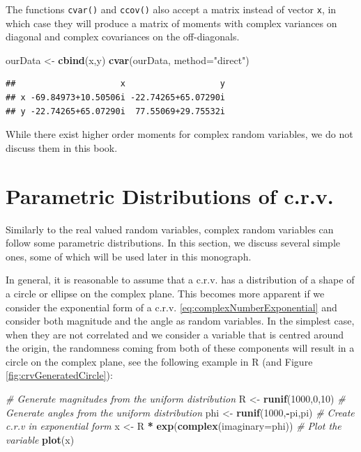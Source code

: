 \documentclass[
]{book}
\newenvironment{Shaded}{\begin{snugshade}}{\end{snugshade}}
\newcommand{\CommentTok}[1]{\textcolor[rgb]{0.56,0.35,0.01}{\textit{#1}}}
\newcommand{\DataTypeTok}[1]{\textcolor[rgb]{0.13,0.29,0.53}{#1}}
\newcommand{\DecValTok}[1]{\textcolor[rgb]{0.00,0.00,0.81}{#1}}
\newcommand{\KeywordTok}[1]{\textcolor[rgb]{0.13,0.29,0.53}{\textbf{#1}}}
\newcommand{\NormalTok}[1]{#1}
\newcommand{\OperatorTok}[1]{\textcolor[rgb]{0.81,0.36,0.00}{\textbf{#1}}}
\newcommand{\StringTok}[1]{\textcolor[rgb]{0.31,0.60,0.02}{#1}}
\begin{document}
The functions \texttt{cvar()} and \texttt{ccov()} also accept a matrix instead of vector \texttt{x}, in which case they will produce a matrix of moments with complex variances on diagonal and complex covariances on the off-diagonals.

\begin{Shaded}
\begin{Highlighting}[]
\NormalTok{ourData \textless{}{-}}\StringTok{ }\KeywordTok{cbind}\NormalTok{(x,y)}
\KeywordTok{cvar}\NormalTok{(ourData, }\DataTypeTok{method=}\StringTok{"direct"}\NormalTok{)}
\end{Highlighting}
\end{Shaded}

\begin{verbatim}
##                     x                   y
## x -69.84973+10.50506i -22.74265+65.07290i
## y -22.74265+65.07290i  77.55069+29.75532i
\end{verbatim}

While there exist higher order moments for complex random variables, we do not discuss them in this book.

\hypertarget{parametric-distributions-of-c.r.v.}{%
\section{Parametric Distributions of c.r.v.}\label{parametric-distributions-of-c.r.v.}}

Similarly to the real valued random variables, complex random variables can follow some parametric distributions. In this section, we discuss several simple ones, some of which will be used later in this monograph.

In general, it is reasonable to assume that a c.r.v. has a distribution of a shape of a circle or ellipse on the complex plane. This becomes more apparent if we consider the exponential form of a c.r.v. \eqref{eq:complexNumberExponential} and consider both magnitude and the angle as random variables. In the simplest case, when they are not correlated and we consider a variable that is centred around the origin, the randomness coming from both of these components will result in a circle on the complex plane, see the following example in R (and Figure \ref{fig:crvGeneratedCircle}):

\begin{Shaded}
\begin{Highlighting}[]
\CommentTok{\# Generate magnitudes from the uniform distribution}
\NormalTok{R \textless{}{-}}\StringTok{ }\KeywordTok{runif}\NormalTok{(}\DecValTok{1000}\NormalTok{,}\DecValTok{0}\NormalTok{,}\DecValTok{10}\NormalTok{)}
\CommentTok{\# Generate angles from the uniform distribution}
\NormalTok{phi \textless{}{-}}\StringTok{ }\KeywordTok{runif}\NormalTok{(}\DecValTok{1000}\NormalTok{,}\OperatorTok{{-}}\NormalTok{pi,pi)}
\CommentTok{\# Create c.r.v in exponential form}
\NormalTok{x \textless{}{-}}\StringTok{ }\NormalTok{R }\OperatorTok{*}\StringTok{ }\KeywordTok{exp}\NormalTok{(}\KeywordTok{complex}\NormalTok{(}\DataTypeTok{imaginary=}\NormalTok{phi))}
\CommentTok{\# Plot the variable}
\KeywordTok{plot}\NormalTok{(x)}
\end{Highlighting}
\end{Shaded}
\end{document}
